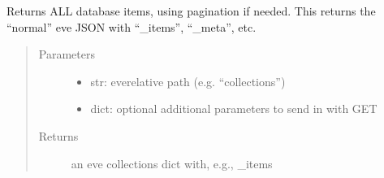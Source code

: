 \documentclass[letterpaper,10pt,english]{sphinxmanual}
\begin{document}
\begin{fulllineitems}
\label{\detokenize{autoapi/pine/backend/data/service/index:pine.backend.data.service.get_all}}
Returns ALL database items, using pagination if needed.  This returns the “normal” eve
JSON with “\_items”, “\_meta”, etc.
\begin{quote}\begin{description}
\item[{Parameters}] \leavevmode\begin{itemize}
\item {} 
 \textendash{} str: eve\sphinxhyphen{}relative path (e.g. “collections”)

\item {} 
 \textendash{} dict: optional additional parameters to send in with GET

\end{itemize}

\item[{Returns}] \leavevmode
an eve collections dict with, e.g., \_items

\end{description}\end{quote}

\end{fulllineitems}

\end{document}
